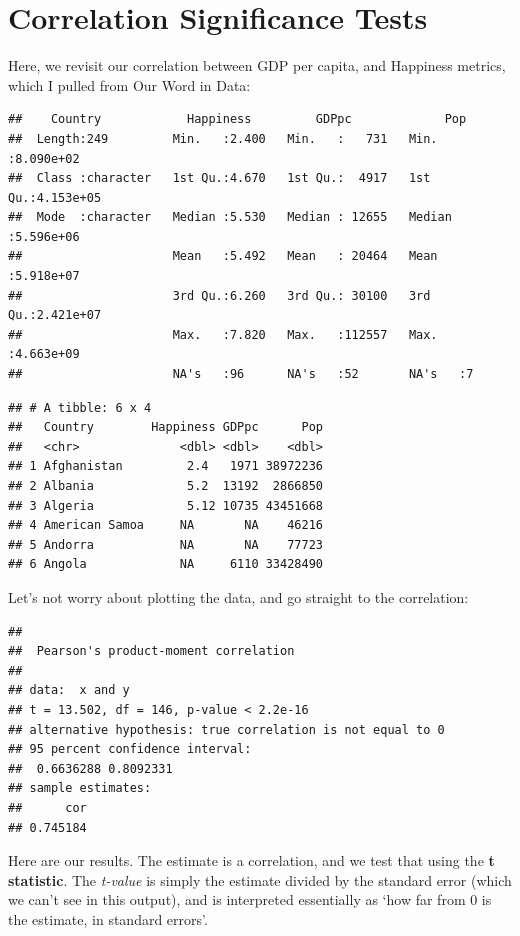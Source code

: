 \documentclass[
]{book}
\begin{document}
\section{Correlation Significance Tests}\label{correlation-significance-tests}

Here, we revisit our correlation between GDP per capita, and Happiness metrics, which I pulled from Our Word in Data:

\begin{verbatim}
##    Country            Happiness         GDPpc             Pop           
##  Length:249         Min.   :2.400   Min.   :   731   Min.   :8.090e+02  
##  Class :character   1st Qu.:4.670   1st Qu.:  4917   1st Qu.:4.153e+05  
##  Mode  :character   Median :5.530   Median : 12655   Median :5.596e+06  
##                     Mean   :5.492   Mean   : 20464   Mean   :5.918e+07  
##                     3rd Qu.:6.260   3rd Qu.: 30100   3rd Qu.:2.421e+07  
##                     Max.   :7.820   Max.   :112557   Max.   :4.663e+09  
##                     NA's   :96      NA's   :52       NA's   :7
\end{verbatim}

\begin{verbatim}
## # A tibble: 6 x 4
##   Country        Happiness GDPpc      Pop
##   <chr>              <dbl> <dbl>    <dbl>
## 1 Afghanistan         2.4   1971 38972236
## 2 Albania             5.2  13192  2866850
## 3 Algeria             5.12 10735 43451668
## 4 American Samoa     NA       NA    46216
## 5 Andorra            NA       NA    77723
## 6 Angola             NA     6110 33428490
\end{verbatim}

Let's not worry about plotting the data, and go straight to the correlation:

\begin{verbatim}
## 
##  Pearson's product-moment correlation
## 
## data:  x and y
## t = 13.502, df = 146, p-value < 2.2e-16
## alternative hypothesis: true correlation is not equal to 0
## 95 percent confidence interval:
##  0.6636288 0.8092331
## sample estimates:
##      cor 
## 0.745184
\end{verbatim}

Here are our results. The estimate is a correlation, and we test that using the \textbf{t statistic}. The \emph{t-value} is simply the estimate divided by the standard error (which we can't see in this output), and is interpreted essentially as `how far from 0 is the estimate, in standard errors'.
\end{document}
